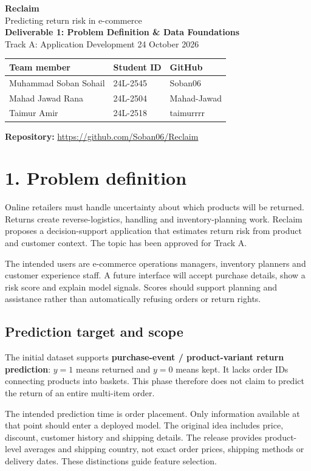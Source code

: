 \documentclass[11pt,a4paper]{article}
\newcommand{\smalltable}{\small\renewcommand{\arraystretch}{1.2}}
\begin{document}
{\LARGE\bfseries\color{reclaim} Reclaim}\\[3pt]
{\large Predicting return risk in e-commerce}\\[4pt]
\textbf{Deliverable 1: Problem Definition \& Data Foundations}\\
Track A: Application Development \hfill 24 October 2026
\begin{center}\smalltable
\begin{tabularx}{\linewidth}{Xll}
\toprule Team member & Student ID & GitHub\\ \midrule
Muhammad Soban Sohail & 24L-2545 & Soban06\\
Mahad Jawad Rana & 24L-2504 & Mahad-Jawad\\
Taimur Amir & 24L-2518 & taimurrrr\\ \bottomrule
\end{tabularx}\end{center}
\textbf{Repository:} \url{https://github.com/Soban06/Reclaim}
\section*{1. Problem definition}
Online retailers must handle uncertainty about which products will be returned. Returns create reverse-logistics, handling and inventory-planning work. Reclaim proposes a decision-support application that estimates return risk from product and customer context. The topic has been approved for Track A.

The intended users are e-commerce operations managers, inventory planners and customer experience staff. A future interface will accept purchase details, show a risk score and explain model signals. Scores should support planning and assistance rather than automatically refusing orders or return rights.

\subsection*{Prediction target and scope}
The initial dataset supports \textbf{purchase-event / product-variant return prediction}: \(y=1\) means returned and \(y=0\) means kept. It lacks order IDs connecting products into baskets. This phase therefore does not claim to predict the return of an entire multi-item order.

The intended prediction time is order placement. Only information available at that point should enter a deployed model. The original idea includes price, discount, customer history and shipping details. The release provides product-level averages and shipping country, not exact order prices, shipping methods or delivery dates. These distinctions guide feature selection.
\end{document}
